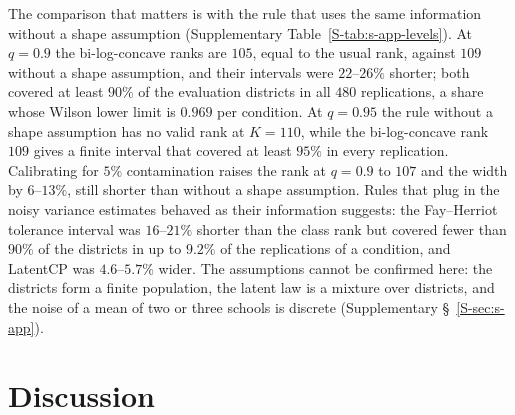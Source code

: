 \documentclass[12pt]{article}
\theoremstyle{definition}
\begin{document}
The comparison that matters is with the rule that uses the same information without a shape assumption (Supplementary Table~\ref{S-tab:s-app-levels}). At $q = 0.9$ the bi-log-concave ranks are $105$, equal to the usual rank, against $109$ without a shape assumption, and their intervals were $22$--$26\%$ shorter; both covered at least $90\%$ of the evaluation districts in all $480$ replications, a share whose Wilson lower limit is $0.969$ per condition. At $q = 0.95$ the rule without a shape assumption has no valid rank at $K = 110$, while the bi-log-concave rank $109$ gives a finite interval that covered at least $95\%$ in every replication. Calibrating for $5\%$ contamination raises the rank at $q = 0.9$ to $107$ and the width by $6$--$13\%$, still shorter than without a shape assumption. Rules that plug in the noisy variance estimates behaved as their information suggests: the Fay--Herriot tolerance interval was $16$--$21\%$ shorter than the class rank but covered fewer than $90\%$ of the districts in up to $9.2\%$ of the replications of a condition, and LatentCP was $4.6$--$5.7\%$ wider. The assumptions cannot be confirmed here: the districts form a finite population, the latent law is a mixture over districts, and the noise of a mean of two or three schools is discrete (Supplementary \S~\ref{S-sec:s-app}).

\section{Discussion}\label{sec:discussion}
\end{document}
